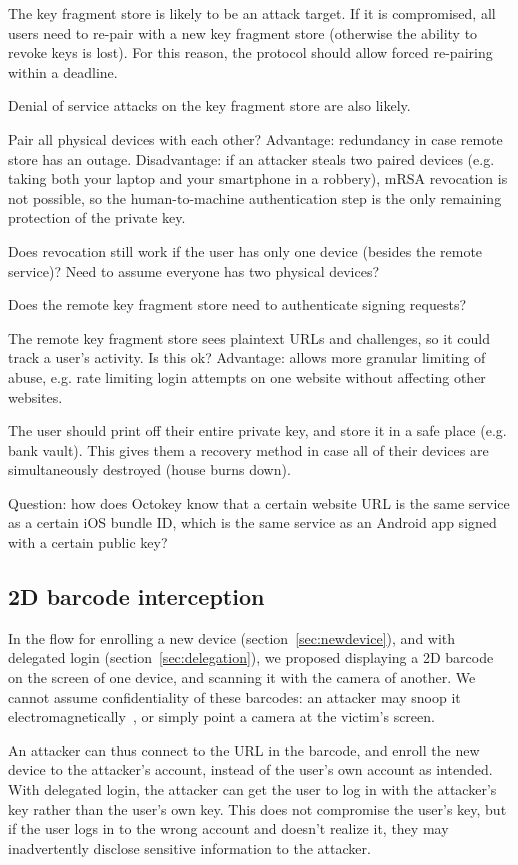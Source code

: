 The key fragment store is likely to be an attack target. If it is compromised, all users need to
re-pair with a new key fragment store (otherwise the ability to revoke keys is lost). For this
reason, the protocol should allow forced re-pairing within a deadline.

Denial of service attacks on the key fragment store are also likely.

Pair all physical devices with each other? Advantage: redundancy in case remote store has an outage.
Disadvantage: if an attacker steals two paired devices (e.g. taking both your laptop and your
smartphone in a robbery), mRSA revocation is not possible, so the human-to-machine authentication
step is the only remaining protection of the private key.

Does revocation still work if the user has only one device (besides the remote service)?
Need to assume everyone has two physical devices?

Does the remote key fragment store need to authenticate signing requests?

The remote key fragment store sees plaintext URLs and challenges, so it could track a user's
activity. Is this ok? Advantage: allows more granular limiting of abuse, e.g. rate limiting login
attempts on one website without affecting other websites.

The user should print off their entire private key, and store it in a safe place (e.g. bank vault).
This gives them a recovery method in case all of their devices are simultaneously destroyed (house
burns down).

Question: how does Octokey know that a certain website URL is the same service as a certain iOS
bundle ID, which is the same service as an Android app signed with a certain public key?

\subsection{2D barcode interception}\label{sec:barcode-intercept}

In the flow for enrolling a new device (section~\ref{sec:newdevice}), and with delegated login
(section~\ref{sec:delegation}), we proposed displaying a 2D barcode on the screen of one device, and
scanning it with the camera of another. We cannot assume confidentiality of these barcodes: an
attacker may snoop it electromagnetically~\cite{Kuhn05}, or simply point a camera at the victim's
screen.

An attacker can thus connect to the URL in the barcode, and enroll the new device to the attacker's
account, instead of the user's own account as intended. With delegated login, the attacker can get
the user to log in with the attacker's key rather than the user's own key. This does not compromise
the user's key, but if the user logs in to the wrong account and doesn't realize it, they may
inadvertently disclose sensitive information to the attacker.


